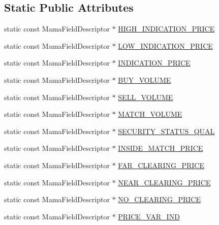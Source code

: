 \subsection*{Static Public Attributes}
\begin{CompactItemize}
\item 
static const Mama\-Field\-Descriptor $\ast$ \hyperlink{classWombat_1_1MamdaOrderImbalanceFields_f3a2769ed37b714c13d002cf96e8b38d}{HIGH\_\-INDICATION\_\-PRICE}
\item 
static const Mama\-Field\-Descriptor $\ast$ \hyperlink{classWombat_1_1MamdaOrderImbalanceFields_f29ad6ffd450ef2856ee4eca7706c162}{LOW\_\-INDICATION\_\-PRICE}
\item 
static const Mama\-Field\-Descriptor $\ast$ \hyperlink{classWombat_1_1MamdaOrderImbalanceFields_777310b974e5fd0a2bf5b81f9e6d2ad6}{INDICATION\_\-PRICE}
\item 
static const Mama\-Field\-Descriptor $\ast$ \hyperlink{classWombat_1_1MamdaOrderImbalanceFields_8ef5e1d4798c6e79032e47293b7af077}{BUY\_\-VOLUME}
\item 
static const Mama\-Field\-Descriptor $\ast$ \hyperlink{classWombat_1_1MamdaOrderImbalanceFields_28f0f32a539c9d2853b4bce666d1bf8f}{SELL\_\-VOLUME}
\item 
static const Mama\-Field\-Descriptor $\ast$ \hyperlink{classWombat_1_1MamdaOrderImbalanceFields_2041fff9cb11ae7e00bb7a98f9cfc250}{MATCH\_\-VOLUME}
\item 
static const Mama\-Field\-Descriptor $\ast$ \hyperlink{classWombat_1_1MamdaOrderImbalanceFields_1fde5f26e36a92f6eb9d4ec729766203}{SECURITY\_\-STATUS\_\-QUAL}
\item 
static const Mama\-Field\-Descriptor $\ast$ \hyperlink{classWombat_1_1MamdaOrderImbalanceFields_b02b9e6b6293117e6ed80be80d3d8901}{INSIDE\_\-MATCH\_\-PRICE}
\item 
static const Mama\-Field\-Descriptor $\ast$ \hyperlink{classWombat_1_1MamdaOrderImbalanceFields_2d9e961d7cc4bf8e8a31ad1aef2335e6}{FAR\_\-CLEARING\_\-PRICE}
\item 
static const Mama\-Field\-Descriptor $\ast$ \hyperlink{classWombat_1_1MamdaOrderImbalanceFields_156c8d50747b4126222a48384f0df576}{NEAR\_\-CLEARING\_\-PRICE}
\item 
static const Mama\-Field\-Descriptor $\ast$ \hyperlink{classWombat_1_1MamdaOrderImbalanceFields_317e693301c1150ea28a6f7514b8edbb}{NO\_\-CLEARING\_\-PRICE}
\item 
static const Mama\-Field\-Descriptor $\ast$ \hyperlink{classWombat_1_1MamdaOrderImbalanceFields_5e250f064156730b51c5659463ea5dac}{PRICE\_\-VAR\_\-IND}

\end{CompactItemize}
